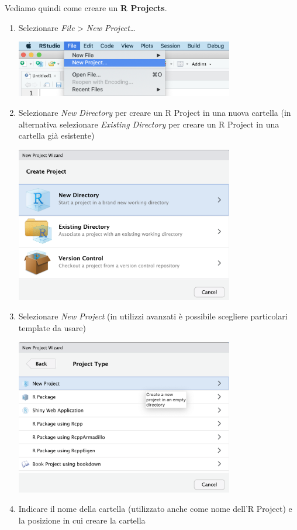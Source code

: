 \documentclass[
]{book}
\providecommand{\tightlist}{%
  \setlength{\itemsep}{0pt}\setlength{\parskip}{0pt}}
\begin{document}
Vediamo quindi come creare un \textbf{R Projects}.

\begin{enumerate}
\def\labelenumi{\arabic{enumi}.}
\tightlist
\item
  Selezionare \emph{File} \textgreater{} \emph{New Project\ldots{}}

  \includegraphics[width=0.75\textwidth,height=\textheight]{images/r-project-1.png}
\item
  Selezionare \emph{New Directory} per creare un R Project in una nuova cartella (in alternativa selezionare \emph{Existing Directory} per creare un R Project in una cartella già esistente)

  \includegraphics[width=0.75\textwidth,height=\textheight]{images/r-project-2.png}
\item
  Selezionare \emph{New Project} (in utilizzi avanzati è possibile scegliere particolari template da usare)

  \includegraphics[width=0.75\textwidth,height=\textheight]{images/r-project-3.png}
\item
  Indicare il nome della cartella (utilizzato anche come nome dell'R Project) e la posizione in cui creare la cartella


\end{enumerate}
\end{document}
